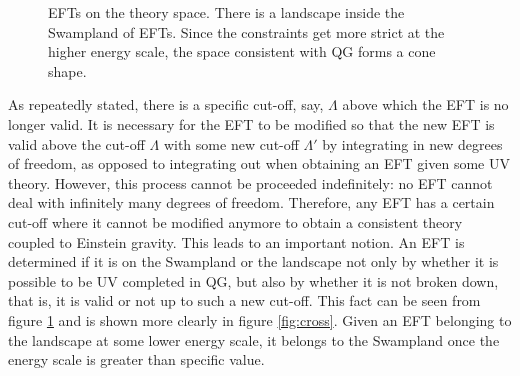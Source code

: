 \begin{figure}
\caption{EFTs on the theory space. There is a landscape inside the Swampland of EFTs. Since the constraints get more strict at the higher energy scale, the space consistent with QG forms a cone shape.}
\label{fig:swampland}
\end{figure}

\indent As repeatedly stated, there is a specific cut-off, say, $\Lambda$ above which the EFT is no longer valid. It is necessary for the EFT to be modified so that the new EFT is valid above the cut-off $\Lambda$ with some new cut-off $\Lambda'$ by integrating in new degrees of freedom, as opposed to integrating out when obtaining an EFT given some UV theory. However, this process cannot be proceeded indefinitely: no EFT cannot deal with infinitely many degrees of freedom. Therefore, any EFT has a certain cut-off where it cannot be modified anymore to obtain a consistent theory coupled to Einstein gravity. This leads to an important notion. An EFT is determined if it is on the Swampland or the landscape not only by whether it is possible to be UV completed in QG, but also by whether it is not broken down, that is, it is valid or not up to such a new cut-off. This fact can be seen from figure \ref{fig:swampland} and is shown more clearly in figure \ref{fig:cross}. Given an EFT belonging to the landscape at some lower energy scale, it belongs to the Swampland once the energy scale is greater than specific value. 

